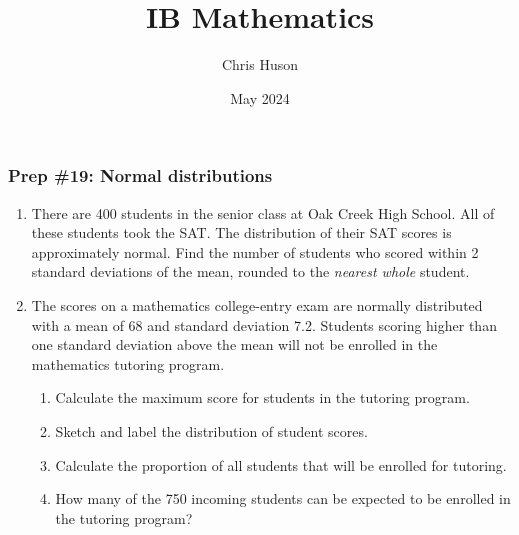 \documentclass[12pt, twoside]{article}
\title{IB Mathematics}
\author{Chris Huson}
\date{May 2024}
\begin{document}
\subsubsection*{Prep \#19: Normal distributions}

\begin{enumerate}
\item There are 400 students in the senior class at Oak Creek High School. All of these students took the SAT. The distribution of their SAT scores is approximately normal. Find the number of students who scored within 2 standard deviations of the mean, rounded to the \emph{nearest whole} student. \vspace{5cm}

\item The scores on a mathematics college-entry exam are normally distributed with a mean of 68 and standard deviation 7.2. Students scoring higher than one standard deviation above the mean will not be enrolled in the mathematics tutoring program. 
    \begin{enumerate}
        \item Calculate the maximum score for students in the tutoring program. \vspace{1cm}
        \item Sketch and label the distribution of student scores. \vspace{3cm}
        \item Calculate the proportion of all students that will be enrolled for tutoring. \vspace{2cm}
        \item How many of the 750 incoming students can be expected to be enrolled in the tutoring program?
    \end{enumerate} \vspace{2cm}



\end{enumerate}
\end{document}
